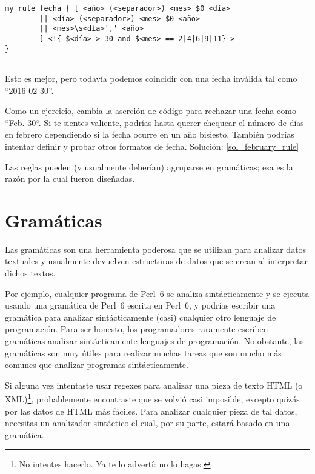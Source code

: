 
\begin{verbatim}
my rule fecha { [ <año> (<separador>) <mes> $0 <día> 
		|| <día> (<separador>) <mes> $0 <año> 
		|| <mes>\s<día>',' <año>
		] <!{ $<día> > 30 and $<mes> == 2|4|6|9|11} >
}
                        
\end{verbatim}

Esto es mejor, pero todavía podemos coincidir con una fecha 
inválida tal como ``2016-02-30''.

\begin{exercise}
\label{february_rule}
%
Como un ejercicio, cambia la aserción de código para
rechazar una fecha como ``Feb. 30``. Si te sientes
valiente, podrías hasta querer chequear el número de días
en febrero dependiendo si la fecha ocurre en un año bisiesto.
También podrías intentar definir y probar otros
formatos de fecha. Solución: \ref{sol_february_rule}
\end{exercise}

Las reglas pueden (y usualmente deberían) agruparse en 
gramáticas; esa es la razón por la cual fueron diseñadas.

\section{Gramáticas}

Las gramáticas son una herramienta poderosa que se utilizan
para analizar datos textuales y usualmente devuelven 
estructuras de datos que se crean al interpretar dichos textos.

Por ejemplo, cualquier programa de Perl~6 se analiza sintácticamente
y se ejecuta usando una gramática de Perl~6 escrita en Perl~6, 
y podrías escribir una gramática para analizar sintácticamente
(casi) cualquier otro lenguaje de programación. Para ser honesto,
los programadores raramente escriben gramáticas analizar sintácticamente
lenguajes de programación. No obstante, las gramáticas son muy útiles para
realizar muchas tareas que son mucho más comunes que analizar
programas sintácticamente.

Si alguna vez intentaste usar regexes para analizar una
pieza de texto HTML (o XML)\footnote{No intentes hacerlo.
Ya te lo advertí: no lo hagas.}, probablemente encontraste
que se volvió casi imposible, excepto quizás por las datos
de HTML más fáciles. Para analizar cualquier pieza de tal
datos, necesitas un analizador sintáctico el cual, por su parte,
estará basado en una gramática.

